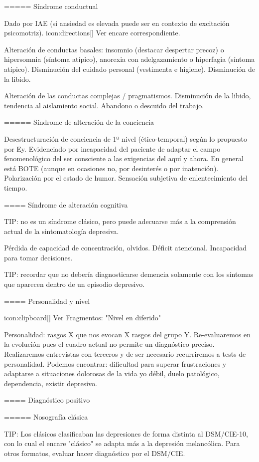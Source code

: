 \documentclass[encares.tex]{subfiles}
\begin{document}
===== Síndrome conductual

Dado por IAE (si ansiedad es elevada puede ser en contexto de excitación psicomotriz). icon:directions[] Ver encare correspondiente.

Alteración de conductas basales: insomnio (destacar despertar precoz) o hipersomnia (síntoma atípico), anorexia con adelgazamiento o hiperfagia (síntoma atípico). Disminución del cuidado personal (vestimenta e higiene). Disminución de la libido.

Alteración de las conductas complejas / pragmatismos. Disminución de la libido, tendencia al aislamiento social. Abandono o descuido del trabajo.

===== Síndrome de alteración de la conciencia

Desestructuración de conciencia de 1º nivel (ético-temporal) según lo propuesto por Ey. Evidenciado por incapacidad del paciente de adaptar el campo fenomenológico del ser consciente a las exigencias del aquí y ahora.
En general está BOTE (aunque en ocasiones no, por desinterés o por inatención). Polarización por el estado de humor.
Sensación subjetiva de enlentecimiento del tiempo.

==== Síndrome de alteración cognitiva

TIP: no es un síndrome clásico, pero puede adecuarse más a la comprensión actual de la sintomatología depresiva.

Pérdida de capacidad de concentración, olvidos. Déficit atencional.
Incapacidad para tomar decisiones.

TIP: recordar que no debería diagnosticarse demencia solamente con los síntomas que aparecen dentro de un episodio depresivo.

==== Personalidad y nivel

icon:clipboard[] Ver Fragmentos: "Nivel en diferido"

Personalidad: rasgos X que nos evocan X rasgos del grupo Y. Re-evaluaremos en la evolución pues el cuadro actual no permite un diagnóstico preciso. Realizaremos entrevistas con terceros y de ser necesario recurriremos a tests de personalidad. Podemos encontrar: dificultad para superar frustraciones y adaptarse a situaciones dolorosas de la vida yo débil, duelo patológico, dependencia, existir depresivo.

==== Diagnóstico positivo

===== Nosografía clásica

TIP: Los clásicos clasificaban las depresiones de forma distinta al DSM/CIE-10, con lo cual el encare "clásico" se adapta más a la depresión melancólica. Para otros formatos, evaluar hacer diagnóstico por el DSM/CIE.
\end{document}
